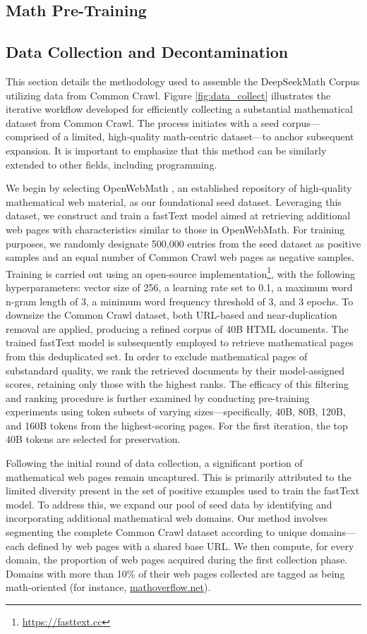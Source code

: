 \begin{itemize}[topsep=0pt]
\section{Math Pre-Training}

\subsection{Data Collection and Decontamination} This section details the methodology used to assemble the DeepSeekMath Corpus utilizing data from Common Crawl. Figure \ref{fig:data_collect} illustrates the iterative workflow developed for efficiently collecting a substantial mathematical dataset from Common Crawl. The process initiates with a seed corpus—comprised of a limited, high-quality math-centric dataset—to anchor subsequent expansion. It is important to emphasize that this method can be similarly extended to other fields, including programming.

We begin by selecting OpenWebMath \citep{openwebmath}, an established repository of high-quality mathematical web material, as our foundational seed dataset. Leveraging this dataset, we construct and train a fastText model \citep{joulin2016fasttext} aimed at retrieving additional web pages with characteristics similar to those in OpenWebMath. For training purposes, we randomly designate 500,000 entries from the seed dataset as positive samples and an equal number of Common Crawl web pages as negative samples. Training is carried out using an open-source implementation\footnote{\url{https://fasttext.cc}}, with the following hyperparameters: vector size of 256, a learning rate set to 0.1, a maximum word n-gram length of 3, a minimum word frequency threshold of 3, and 3 epochs. To downsize the Common Crawl dataset, both URL-based and near-duplication removal are applied, producing a refined corpus of 40B HTML documents. The trained fastText model is subsequently employed to retrieve mathematical pages from this deduplicated set. In order to exclude mathematical pages of substandard quality, we rank the retrieved documents by their model-assigned scores, retaining only those with the highest ranks. The efficacy of this filtering and ranking procedure is further examined by conducting pre-training experiments using token subsets of varying sizes—specifically, 40B, 80B, 120B, and 160B tokens from the highest-scoring pages. For the first iteration, the top 40B tokens are selected for preservation.

Following the initial round of data collection, a significant portion of mathematical web pages remain uncaptured. This is primarily attributed to the limited diversity present in the set of positive examples used to train the fastText model. To address this, we expand our pool of seed data by identifying and incorporating additional mathematical web domains. Our method involves segmenting the complete Common Crawl dataset according to unique domains—each defined by web pages with a shared base URL. We then compute, for every domain, the proportion of web pages acquired during the first collection phase. Domains with more than 10\% of their web pages collected are tagged as being math-oriented (for instance, \url{mathoverflow.net}).


\end{itemize}
